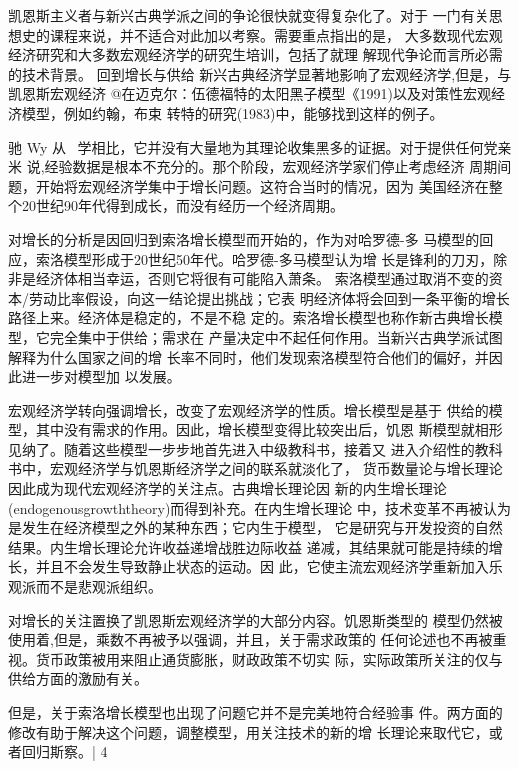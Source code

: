 凯恩斯主义者与新兴古典学派之间的争论很快就变得复杂化了。对于
一门有关思想史的课程来说，并不适合对此加以考察。需要重点指出的是，
大多数现代宏观经济研究和大多数宏观经济学的研究生培训，包括了就理
解现代争论而言所必需的技术背景。
回到增长与供给
新兴古典经济学显著地影响了宏观经济学,但是，与凯恩斯宏观经济
@在迈克尔：伍德福特的太阳黑子模型《1991)以及对策性宏观经济模型，例如约翰，布束
转特的研究(1983)中，能够找到这样的例子。



驰
Wy
从
\
学相比，它并没有大量地为其理论收集黑多的证据。对于提供任何党亲米
说,经验数据是根本不充分的。那个阶段，宏观经济学家们停止考虑经济
周期间题，开始将宏观经济学集中于增长问题。这符合当时的情况，因为
美国经济在整个20世纪90年代得到成长，而没有经历一个经济周期。

对增长的分析是因回归到索洛增长模型而开始的，作为对哈罗德-多
马模型的回应，索洛模型形成于20世纪50年代。哈罗德-多马模型认为增
长是锋利的刀刃，除非是经济体相当幸运，否则它将很有可能陷入萧条。
索洛模型通过取消不变的资本/劳动比率假设，向这一结论提出挑战；它表
明经济体将会回到一条平衡的增长路径上来。经济体是稳定的，不是不稳
定的。索洛增长模型也称作新古典增长模型，它完全集中于供给；需求在
产量决定中不起任何作用。当新兴古典学派试图解释为什么国家之间的增
长率不同时，他们发现索洛模型符合他们的偏好，并因此进一步对模型加
以发展。

宏观经济学转向强调增长，改变了宏观经济学的性质。增长模型是基于
供给的模型，其中没有需求的作用。因此，增长模型变得比较突出后，饥恩
斯模型就相形见纳了。随着这些模型一步步地首先进入中级教科书，接着又
进入介绍性的教科书中，宏观经济学与饥恩斯经济学之间的联系就淡化了，
货币数量论与增长理论因此成为现代宏观经济学的关注点。古典增长理论因
新的内生增长理论(endogenousgrowththeory)而得到补充。在内生增长理论
中，技术变革不再被认为是发生在经济模型之外的某种东西；它内生于模型，
它是研究与开发投资的自然结果。内生增长理论允许收益递增战胜边际收益
递减，其结果就可能是持续的增长，并且不会发生导致静止状态的运动。因
此，它使主流宏观经济学重新加入乐观派而不是悲观派组织。

对增长的关注置换了凯恩斯宏观经济学的大部分内容。饥恩斯类型的
模型仍然被使用着,但是，乘数不再被予以强调，并且，关于需求政策的
任何论述也不再被重视。货币政策被用来阻止通货膨胀，财政政策不切实
际，实际政策所关注的仅与供给方面的激励有关。

但是，关于索洛增长模型也出现了问题它并不是完美地符合经验事
件。两方面的修改有助于解决这个问题，调整模型，用关注技术的新的增
长理论来取代它，或者回归斯察。|
4





